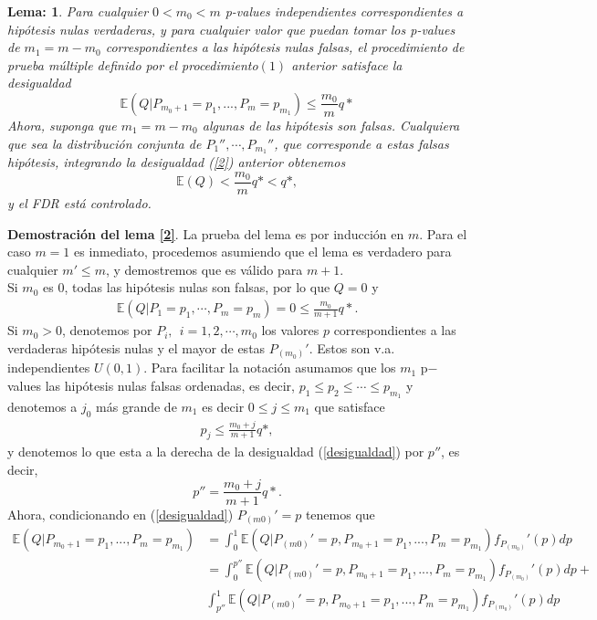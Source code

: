 \documentclass[11pt,letterpaper]{article}
\newcommand{\mE}{\mathbb{E}}
\newtheorem{thml}{Lema:}
\begin{document}
\begin{framed}
    \begin{thml} \label{l_1}
Para cualquier $0 <m_0 <m$ p-values independientes correspondientes a hipótesis nulas verdaderas, y para cualquier valor que puedan tomar los p-values de $m_1= m - m_0$ correspondientes a las hipótesis nulas falsas, el procedimiento de prueba múltiple definido por el procedimiento$(1)$ anterior satisface la desigualdad
\begin{equation}\label{2}
\mE (Q | P_{m_0+1}=p_1, ..., P_m = p_{m_1})\leq \frac{m_0}{m} q *
\end{equation}
Ahora, suponga que $m_1=m-m_0$ algunas de las hipótesis son falsas. Cualquiera que sea la distribución conjunta de $P_1'' ,\cdots, P_{m_1}''$, que corresponde a estas falsas hipótesis, integrando la desigualdad (\ref{2}) anterior obtenemos
\begin{equation*}
\mE(Q) <\frac{m_0}{m}q* <q *,
\end{equation*}
y el FDR está controlado.
    \end{thml}
\end{framed}
\textbf{Demostración del lema \ref{2}}. La prueba del lema es por inducción en $m$. Para el caso $m=1$ es inmediato, procedemos asumiendo que el lema es verdadero para cualquier $m'\leq m$, y demostremos que es válido para $m+1$. \\
Si $m_0$ es 0, todas las hipótesis nulas son falsas, por lo que $Q=0$ y 
\begin{align*}
\mE(Q|P_1=p_1,\cdots, P_m=p_m)=0 \leq \frac{m_0}{m+1}q*.
\end{align*} 
Si $m_0>0$, denotemos por $P_i, \ \ i=1,2,\cdots, m_0$ los valores $p$ correspondientes a las verdaderas hipótesis nulas y el mayor de estas $P_{(m_0)}'$. Estos son v.a. independientes $U(0,1)$. Para facilitar la notación asumamos que los $m_1$ p$-$values las hipótesis nulas falsas ordenadas, es decir, $p_1\leq p_2 \leq \cdots \leq p_{m_1}$ y denotemos a $j_0$ más grande de $m_1$ es decir $0\leq j\leq m_1$ que satisface
\begin{align*}\label{desigualdad}
p_j\leq \frac{m_0+j}{m+1}q*,
\end{align*}
y denotemos lo que esta a la derecha de la desigualdad (\ref{desigualdad}) por $p''$, es decir, $$p''=\frac{m_0+j}{m+1}q*.$$
Ahora, condicionando en (\ref{desigualdad}) $P_{(m0)}'=p$ tenemos que 
\begin{align}
\mE (Q | P_{m_0+1}=p_1, ..., P_m = p_{m_1})&=\int_0^1 \mE (Q | P_{(m0)}'=p, P_{m_0+1}=p_1, ..., P_m = p_{m_1}) f_{P_{(m_0)}}'(p)dp\\
&=\int_0^{p''} \mE (Q | P_{(m0)}'=p, P_{m_0+1}=p_1, ..., P_m = p_{m_1}) f_{P_{(m_0)}}'(p)dp+\\
&\int_{p''}^1 \mE (Q | P_{(m0)}'=p, P_{m_0+1}=p_1, ..., P_m = p_{m_1}) f_{P_{(m_0)}}'(p)dp
\end{align} 
\end{document}
